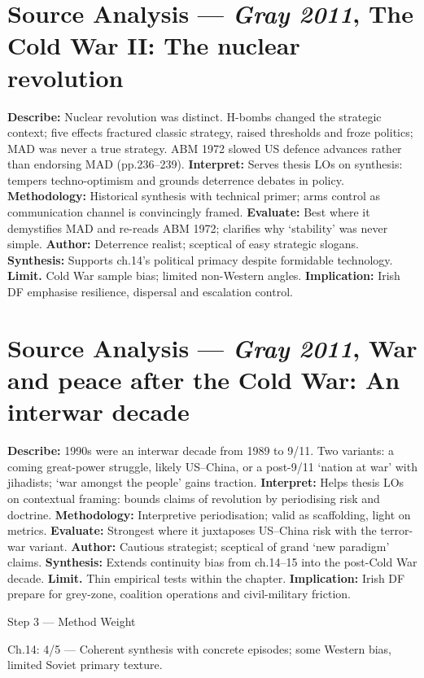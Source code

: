 \section*{Source Analysis — \textit{Gray 2011}, The Cold War II: The nuclear revolution}
\textbf{Describe:} Nuclear revolution was distinct. H-bombs changed the strategic context; five effects fractured classic strategy, raised thresholds and froze politics; MAD was never a true strategy. ABM 1972 slowed US defence advances rather than endorsing MAD (pp.236–239).
\textbf{Interpret:} Serves thesis LOs on synthesis: tempers techno-optimism and grounds deterrence debates in policy.
\textbf{Methodology:} Historical synthesis with technical primer; arms control as communication channel is convincingly framed.
\textbf{Evaluate:} Best where it demystifies MAD and re-reads ABM 1972; clarifies why ‘stability’ was never simple.
\textbf{Author:} Deterrence realist; sceptical of easy strategic slogans.
\textbf{Synthesis:} Supports ch.14’s political primacy despite formidable technology.
\textbf{Limit.} Cold War sample bias; limited non-Western angles.
\textbf{Implication:} Irish DF emphasise resilience, dispersal and escalation control.

\section*{Source Analysis — \textit{Gray 2011}, War and peace after the Cold War: An interwar decade}
\textbf{Describe:} 1990s were an interwar decade from 1989 to 9/11. Two variants: a coming great-power struggle, likely US–China, or a post-9/11 ‘nation at war’ with jihadists; ‘war amongst the people’ gains traction.
\textbf{Interpret:} Helps thesis LOs on contextual framing: bounds claims of revolution by periodising risk and doctrine.
\textbf{Methodology:} Interpretive periodisation; valid as scaffolding, light on metrics.
\textbf{Evaluate:} Strongest where it juxtaposes US–China risk with the terror-war variant.
\textbf{Author:} Cautious strategist; sceptical of grand ‘new paradigm’ claims.
\textbf{Synthesis:} Extends continuity bias from ch.14–15 into the post-Cold War decade.
\textbf{Limit.} Thin empirical tests within the chapter.
\textbf{Implication:} Irish DF prepare for grey-zone, coalition operations and civil-military friction.

Step 3 — Method Weight

Ch.14: 4/5 — Coherent synthesis with concrete episodes; some Western bias, limited Soviet primary texture.

